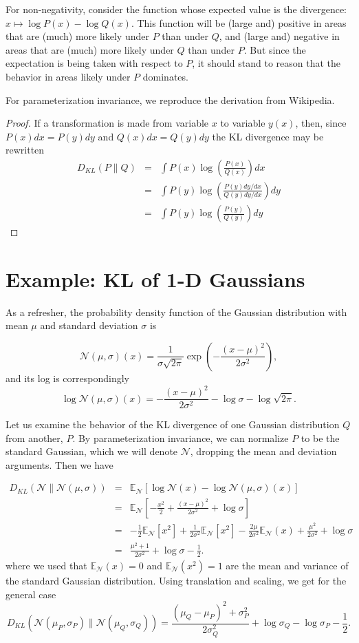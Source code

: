 \documentclass[12pt]{article}
\newcommand{\E}{\mathbb{E}}
\newcommand{\N}{\mathcal{N}}
\begin{document}
For non-negativity, consider the function whose expected value is the
divergence: $x \mapsto \log P(x) - \log Q(x)$.  This function will be
(large and) positive in areas that are (much) more likely under $P$
than under $Q$, and (large and) negative in areas that are (much) more
likely under $Q$ than under $P$.  But since the expectation is being
taken with respect to $P$, it should stand to reason that the behavior
in areas likely under $P$ dominates.

For parameterization invariance, we reproduce the derivation from Wikipedia.
\begin{proof}
If a transformation is made from variable $x$ to variable $y(x)$,
then, since $P(x) dx = P(y) dy$ and $Q(x) dx = Q(y) dy$ the KL divergence
may be rewritten
\begin{eqnarray*}
 D_{KL}(P\|Q) & = & \int P(x) \log \left( \frac{P(x)}{Q(x)} \right) dx \\
  & = & \int P(y) \log \left( \frac{P(y)dy/dx}{Q(y)dy/dx} \right) dy \\
  & = & \int P(y) \log \left( \frac{P(y)}{Q(y)} \right) dy
\end{eqnarray*}
\end{proof}

\section{Example: KL of 1-D Gaussians}

As a refresher, the probability density function of the Gaussian
distribution with mean $\mu$ and standard deviation $\sigma$ is

\[ \N(\mu,\sigma)(x) = \frac{1}{\sigma \sqrt{2 \pi}} \exp \left(-\frac{(x-\mu)^2}{2\sigma^2} \right), \]
and its log is correspondingly
\[ \log \N(\mu,\sigma)(x) = -\frac{(x-\mu)^2}{2\sigma^2} - \log \sigma - \log \sqrt{2\pi}. \]

Let us examine the behavior of the KL divergence of one Gaussian
distribution $Q$ from another, $P$.  By parameterization invariance,
we can normalize $P$ to be the standard Gaussian, which we will denote
$\N$, dropping the mean and deviation arguments.  Then we have

\begin{eqnarray*}
 D_{KL}(\N\|\N(\mu,\sigma)) & = & \E_\N \left[ \log \N(x) - \log \N(\mu,\sigma)(x) \right] \\
 & = & \E_\N \left[ -\frac{x^2}{2} + \frac{(x-\mu)^2}{2\sigma^2} + \log \sigma \right] \\
 & = & -\frac{1}{2} \E_\N[x^2] + \frac{1}{2\sigma^2} \E_\N[x^2] - \frac{2\mu}{2\sigma^2}\E_\N(x)
       + \frac{\mu^2}{2\sigma^2} + \log \sigma \\
 & = & \frac{\mu^2 + 1}{2\sigma^2} + \log \sigma - \frac{1}{2}.
\end{eqnarray*}
where we used that $\E_\N(x) = 0$ and $\E_\N(x^2) = 1$ are
the mean and variance of the standard Gaussian distribution.
Using translation and scaling, we get for the general case
\[ D_{KL}(\N(\mu_P,\sigma_P)\|\N(\mu_Q,\sigma_Q)) = \frac{(\mu_Q-\mu_P)^2 + \sigma_P^2}{2\sigma_Q^2} + \log \sigma_Q - \log \sigma_P - \frac{1}{2}. \]
\end{document}
